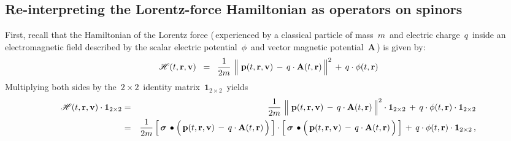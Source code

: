 
\vskip 0.5cm
\subsection{Re-interpreting the Lorentz-force Hamiltonian as operators on spinors}

First, recall that the Hamiltonian of the Lorentz force
(\,experienced by a classical particle of mass \,$m$\, and electric charge \,$q$\,
inside an electromagnetic field described by the scalar electric potential \,$\phi$\, and vector magnetic potential \,$\mathbf{A}$\,)
is given by:
\begin{equation*}
\mathscr{H}(t, \mathbf{r}, \mathbf{v})
\;\; = \;\;
    \dfrac{1}{2m}\,\left\Vert\;
        \mathbf{p}(t,\mathbf{r},\mathbf{v})
        \, \overset{{\color{white}.}}{-} \,
        q\cdot\mathbf{A}(t,\mathbf{r})
        \,\right\Vert^{2}
    \, + \,
    q\cdot\phi(t,\mathbf{r})
\end{equation*}
Multiplying both sides by the \,$2 \times 2$\, identity matrix \,$\boldsymbol{1}_{2 \times 2}$\, yields
\begin{eqnarray*}
\mathscr{H}(t, \mathbf{r}, \mathbf{v})\cdot\boldsymbol{1}_{2 \times 2}
& = &
    \dfrac{1}{2m}\,\left\Vert\;
        \mathbf{p}(t,\mathbf{r},\mathbf{v})
        \, \overset{{\color{white}.}}{-} \,
        q\cdot\mathbf{A}(t,\mathbf{r})
        \,\right\Vert^{2}
    \cdot\boldsymbol{1}_{2 \times 2}
    \, + \,
    q\cdot\phi(t,\mathbf{r})\cdot\boldsymbol{1}_{2 \times 2}
\\
& = &
    \dfrac{1}{2m}
    \left[\,
        \boldsymbol{\sigma}\,\bullet\left(\,
            \mathbf{p}(t,\mathbf{r},\mathbf{v})
            \, \overset{{\color{white}.}}{-} \,
            q\cdot\mathbf{A}(t,\mathbf{r})
            \,\right)
        \,\right]
    \cdot
    \left[\,
        \boldsymbol{\sigma}\,\bullet\left(\,
            \mathbf{p}(t,\mathbf{r},\mathbf{v})
            \, \overset{{\color{white}.}}{-} \,
            q\cdot\mathbf{A}(t,\mathbf{r})
            \,\right)
        \,\right]
    \, + \,
    q\cdot\phi(t,\mathbf{r})\cdot\boldsymbol{1}_{2 \times 2}\,,
\end{eqnarray*}
